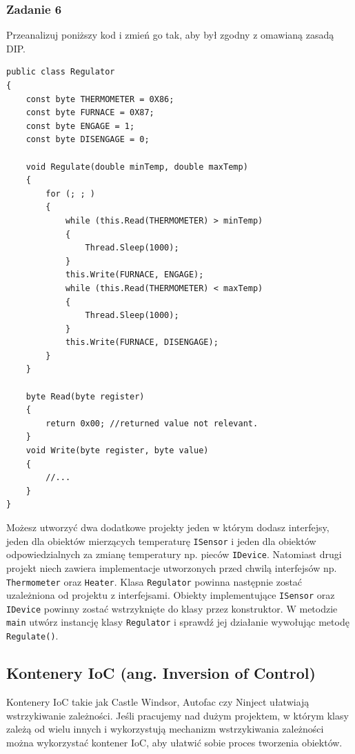 \subsubsection{Zadanie 6}
Przeanalizuj poniższy kod i zmień go tak, aby był zgodny z omawianą zasadą DIP.
\begin{lstlisting}
public class Regulator
{
	const byte THERMOMETER = 0X86;
	const byte FURNACE = 0X87;
	const byte ENGAGE = 1;
	const byte DISENGAGE = 0;
	
	void Regulate(double minTemp, double maxTemp)
	{
		for (; ; )
		{
			while (this.Read(THERMOMETER) > minTemp)
			{
				Thread.Sleep(1000);
			}
			this.Write(FURNACE, ENGAGE);
			while (this.Read(THERMOMETER) < maxTemp)
			{
				Thread.Sleep(1000);
			}
			this.Write(FURNACE, DISENGAGE);
		}
	}
	
	byte Read(byte register)
	{
		return 0x00; //returned value not relevant.
	}
	void Write(byte register, byte value)
	{
		//...
	}
}
\end{lstlisting}

Możesz utworzyć dwa dodatkowe projekty jeden w którym dodasz interfejsy, jeden dla obiektów mierzących temperaturę \texttt{ISensor} i jeden dla obiektów odpowiedzialnych za zmianę temperatury np. pieców \texttt{IDevice}. Natomiast drugi projekt niech zawiera implementacje utworzonych przed chwilą interfejsów np. \texttt{Thermometer} oraz \texttt{Heater}. Klasa \texttt{Regulator} powinna następnie zostać uzależniona od projektu z interfejsami. Obiekty implementujące \texttt{ISensor} oraz \texttt{IDevice} powinny zostać wstrzyknięte do klasy przez konstruktor. W metodzie \texttt{main} utwórz instancję klasy \texttt{Regulator} i sprawdź jej działanie wywołując metodę \texttt{Regulate()}.

\subsection{Kontenery IoC (ang. Inversion of Control)}
Kontenery IoC takie jak Castle Windsor, Autofac czy Ninject ułatwiają wstrzykiwanie zależności. Jeśli pracujemy nad dużym projektem, w którym klasy zależą od wielu innych i wykorzystują mechanizm wstrzykiwania zależności można wykorzystać kontener IoC, aby ułatwić sobie proces tworzenia obiektów. 

